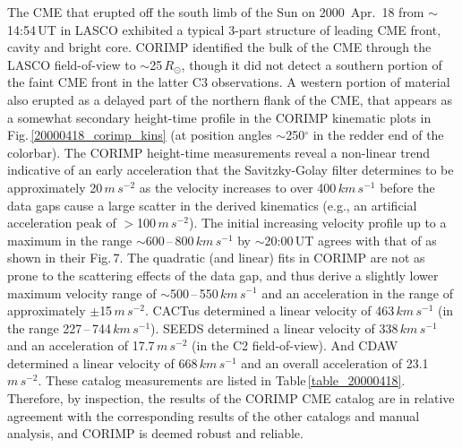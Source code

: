 \documentclass[referee,a4paper,12pt,traditabstract]{swsc}
\begin{document}
\begin{linenumbers}
The CME that erupted off the south limb of the Sun on 2000~Apr.~18 from $\sim$14:54\,UT in LASCO exhibited a typical 3-part structure of leading CME front, cavity and bright core. CORIMP identified the bulk of the CME through the LASCO field-of-view to $\sim$25\,$R_\odot$, though it did not detect a southern portion of the faint CME front in the latter C3 observations. A western portion of material also erupted as a delayed part of the northern flank of the CME, that appears as a somewhat secondary height-time profile in the CORIMP kinematic plots in Fig.\,\ref{20000418_corimp_kins} (at position angles $\sim$250$^{\circ}$ in the redder end of the colorbar). The CORIMP height-time measurements reveal a non-linear trend indicative of an early acceleration that the Savitzky-Golay filter determines to be approximately 20\,$m\,s^{-2}$ as the velocity increases to over 400\,$km\,s^{-1}$ before the data gaps cause a large scatter in the derived kinematics (e.g., an artificial acceleration peak of $>$100\,$m\,s^{-2}$). The initial increasing velocity profile up to a maximum in the range $\sim$600\,--\,800\,$km\,s^{-1}$ by $\sim$20:00\,UT agrees with that of \cite{2009A&A...495..325B} as shown in their Fig.\,7. The quadratic (and linear) fits in CORIMP are not as prone to the scattering effects of the data gap, and thus derive a slightly lower maximum velocity range of $\sim$500\,--\,550\,$km\,s^{-1}$ and an acceleration in the range of approximately $\pm$15\,$m\,s^{-2}$. CACTus determined a linear velocity of 463$\,km\,s^{-1}$ (in the range 227\,--\,744\,$km\,s^{-1}$). SEEDS determined a linear velocity of 338$\,km\,s^{-1}$ and an acceleration of 17.7\,$m\,s^{-2}$ (in the C2 field-of-view). And CDAW determined a linear velocity of 668$\,km\,s^{-1}$ and an overall acceleration of 23.1\,$m\,s^{-2}$. These catalog measurements are listed in Table\,\ref{table_20000418}. Therefore, by inspection, the results of the CORIMP CME catalog are in relative agreement with the corresponding results of the other catalogs and manual analysis, and CORIMP is deemed robust and reliable.







\end{linenumbers}
\end{document}
